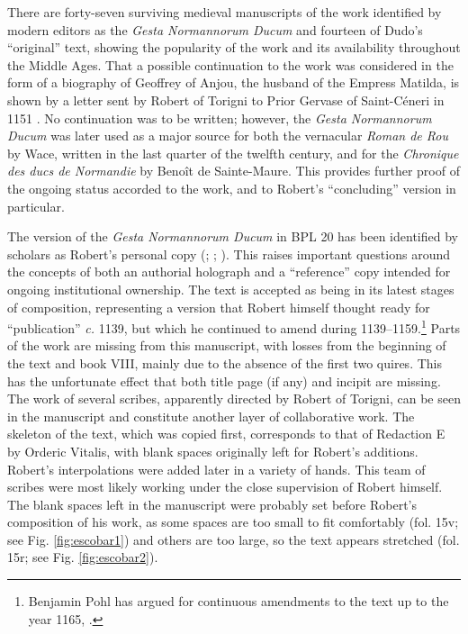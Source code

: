 \begin{paper}
There are forty-seven surviving medieval manuscripts of the work
identified by modern editors as the \emph{Gesta Normannorum Ducum} and
fourteen of Dudo's ``original'' text, showing the popularity of the work
and its availability throughout the Middle Ages. That a possible
continuation to the work was considered in the form of a biography of
Geoffrey of Anjou, the husband of the Empress Matilda, is shown by a
letter sent by Robert of Torigni to Prior Gervase of Saint-Céneri in
1151 \citep[132]{van_houts_writing_2018}. No continuation was to be written; however,
the \emph{Gesta Normannorum Ducum} was later used as a major source for
both the vernacular \emph{Roman de Rou} by Wace, written in the last
quarter of the twelfth century, and for the \emph{Chronique des ducs de
Normandie} by Benoît de Sainte-Maure. This provides further proof of the
ongoing status accorded to the work, and to Robert's ``concluding''
version in particular.

The version of the \emph{Gesta Normannorum Ducum} in BPL 20 has been
identified by scholars as Robert's personal copy (\cite[cix, cxxvi]{van_houts_gesta_1992}; \cite[95]{cleaver_autograph_2018}; \cite[59]{pohl_abbas_2014}). This raises important questions
around the concepts of both an authorial holograph and a ``reference''
copy intended for ongoing institutional ownership. The text is accepted
as being in its latest stages of composition, representing a version
that Robert himself thought ready for ``publication'' \emph{c.} 1139, but
which he continued to amend during 1139--1159.\footnote{Benjamin Pohl has
  argued for continuous amendments to the text up to the year 1165,
  \citep[52, 59, 63]{pohl_abbas_2014}.} Parts of the work are missing from this
manuscript, with losses from the beginning of the text and book VIII,
mainly due to the absence of the first two quires. This has the
unfortunate effect that both title page (if any) and incipit are
missing. The work of several scribes, apparently directed by Robert of
Torigni, can be seen in the manuscript and constitute another layer of
collaborative work. The skeleton of the text, which was copied first,
corresponds to that of Redaction E by Orderic Vitalis, with blank spaces
originally left for Robert's additions. Robert's interpolations were
added later in a variety of hands. This team of scribes were most likely
working under the close supervision of Robert himself. The blank spaces
left in the manuscript were probably set before Robert's composition of
his work, as some spaces are too small to fit comfortably (fol. 15v; see
Fig. \ref{fig:escobar1}) and others are too large, so the text appears stretched (fol.
15r; see Fig. \ref{fig:escobar2}).


\end{paper}
